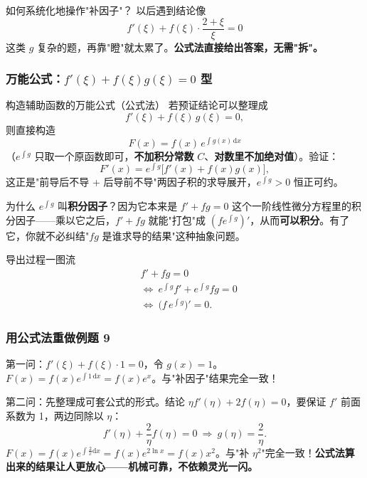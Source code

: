 \documentclass[a4paper]{article}
\begin{document}
\begin{knowledgebox}{如何系统化地操作"补因子"？}
以后遇到结论像
\[
f'(\xi)+f(\xi)\cdot\frac{2+\xi}{\xi}=0
\]
这类 $g$ 复杂的题，再靠"瞪"就太累了。\textbf{公式法直接给出答案，无需"拆"。}
\end{knowledgebox}

\subsubsection{万能公式：$f'(\xi)+f(\xi)g(\xi)=0$ 型}

\begin{importantbox}{构造辅助函数的万能公式（公式法）}
若预证结论可以整理成
\[
f'(\xi)+f(\xi)\,g(\xi)=0 ,
\]
则直接构造
\[
\boxed{\ F(x)=f(x)\,e^{\int g(x)\,\mathrm{d}x}\ }
\]
（$e^{\int g}$ 只取一个原函数即可，\textbf{不加积分常数 }$C$、\textbf{对数里不加绝对值}）。验证：
\[
F'(x)=e^{\int g}\big[f'(x)+f(x)g(x)\big],
\]
这正是"前导后不导 + 后导前不导"两因子积的求导展开，$e^{\int g}>0$ 恒正可约。
\end{importantbox}

为什么 $e^{\int g}$ 叫\textbf{积分因子}？因为它本来是 $f'+fg=0$ 这个一阶线性微分方程里的积分因子——乘以它之后，$f'+fg$ 就能"打包"成 $(fe^{\int g})'$，从而\textbf{可以积分}。有了它，你就不必纠结"$fg$ 是谁求导的结果"这种抽象问题。

\begin{knowledgebox}{导出过程一图流}
\begin{align*}
&f'+fg=0\\
&\Longleftrightarrow\ e^{\int g}f'+e^{\int g}fg=0\\
&\Longleftrightarrow\ \big(f\,e^{\int g}\big)'=0 .
\end{align*}
\end{knowledgebox}

\subsubsection{用公式法重做例题 9}

第一问：$f'(\xi)+f(\xi)\cdot 1=0$，令 $g(x)=1$。$F(x)=f(x)e^{\int 1\,\mathrm{d}x}=f(x)e^{x}$。与"补因子"结果完全一致！

第二问：先整理成可套公式的形式。结论 $\eta f'(\eta)+2f(\eta)=0$，要保证 $f'$ 前面系数为 1，两边同除以 $\eta$：
\[
f'(\eta)+\frac{2}{\eta}f(\eta)=0\ \Rightarrow\ g(\eta)=\frac{2}{\eta}.
\]
$F(x)=f(x)e^{\int \frac{2}{x}\mathrm{d}x}=f(x)e^{2\ln x}=f(x)x^2$。与"补 $\eta^2$"完全一致！\textbf{公式法算出来的结果让人更放心——机械可靠，不依赖灵光一闪。}
\end{document}
